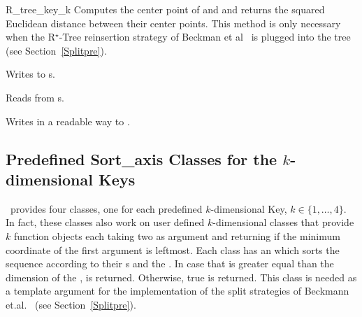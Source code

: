 \begin{ccClass}{R_tree_key_k}
{Computes the center point of  and   and returns
  the squared Euclidean distance between their center points. 
This method is only
  necessary when the R$^\star$-Tree reinsertion strategy of Beckman et
  al~\cite{Beckmann:1990:RER} is plugged into the tree (see
  Section~\ref{Splitpre}).}


{Writes  to s.}

{Reads  from s.}

{Writes  in a readable way to .}

\end{ccClass}

\subsection{Predefined Sort\_axis Classes for the $k$-dimensional Keys}
\label{Presort}
\cgal\ provides four  classes, one for each
predefined $k$-dimensional Key, $k\in\{1,\ldots,4\}$. In fact,
these classes also work on user defined $k$-dimensional  classes that
provide $k$ function objects 
each taking two  as argument and returning 
if the minimum coordinate of the first argument is leftmost.   Each class
has an  which sorts the
sequence \ccc{[first,last[} according to their s and the
. In
case that  is greater equal than the dimension of
the ,  is returned. Otherwise, true is returned.
This class is needed  as a template argument for the
implementation of the split strategies of  Beckmann
et.al.~\cite{Beckmann:1990:RER} (see Section~\ref{Splitpre}). 


